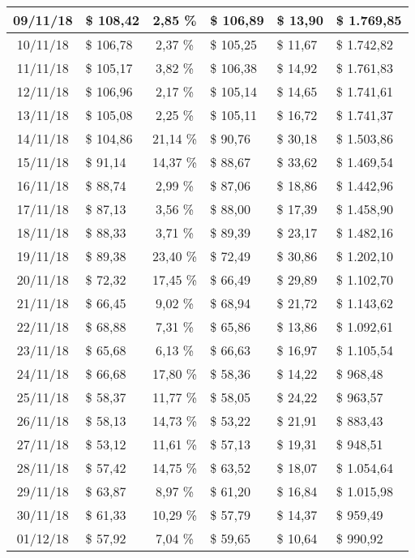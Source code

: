 \begin{center}
\begin{small}
\begin{longtable}{|c|l|c|l|l|l|}
09/11/18 & \$ 108,42 & 2,85 \% & \$ 106,89 & \$ 13,90 & \$ 1.769,85 \\ \hline
10/11/18 & \$ 106,78 & 2,37 \% & \$ 105,25 & \$ 11,67 & \$ 1.742,82 \\ \hline
11/11/18 & \$ 105,17 & 3,82 \% & \$ 106,38 & \$ 14,92 & \$ 1.761,83 \\ \hline
12/11/18 & \$ 106,96 & 2,17 \% & \$ 105,14 & \$ 14,65 & \$ 1.741,61 \\ \hline
13/11/18 & \$ 105,08 & 2,25 \% & \$ 105,11 & \$ 16,72 & \$ 1.741,37 \\ \hline
14/11/18 & \$ 104,86 & 21,14 \% & \$ 90,76 & \$ 30,18 & \$ 1.503,86 \\ \hline
15/11/18 & \$ 91,14 & 14,37 \% & \$ 88,67 & \$ 33,62 & \$ 1.469,54 \\ \hline
16/11/18 & \$ 88,74 & 2,99 \% & \$ 87,06 & \$ 18,86 & \$ 1.442,96 \\ \hline
17/11/18 & \$ 87,13 & 3,56 \% & \$ 88,00 & \$ 17,39 & \$ 1.458,90 \\ \hline
18/11/18 & \$ 88,33 & 3,71 \% & \$ 89,39 & \$ 23,17 & \$ 1.482,16 \\ \hline
19/11/18 & \$ 89,38 & 23,40 \% & \$ 72,49 & \$ 30,86 & \$ 1.202,10 \\ \hline
20/11/18 & \$ 72,32 & 17,45 \% & \$ 66,49 & \$ 29,89 & \$ 1.102,70 \\ \hline
21/11/18 & \$ 66,45 & 9,02 \% & \$ 68,94 & \$ 21,72 & \$ 1.143,62 \\ \hline
22/11/18 & \$ 68,88 & 7,31 \% & \$ 65,86 & \$ 13,86 & \$ 1.092,61 \\ \hline
23/11/18 & \$ 65,68 & 6,13 \% & \$ 66,63 & \$ 16,97 & \$ 1.105,54 \\ \hline
24/11/18 & \$ 66,68 & 17,80 \% & \$ 58,36 & \$ 14,22 & \$ 968,48 \\ \hline
25/11/18 & \$ 58,37 & 11,77 \% & \$ 58,05 & \$ 24,22 & \$ 963,57 \\ \hline
26/11/18 & \$ 58,13 & 14,73 \% & \$ 53,22 & \$ 21,91 & \$ 883,43 \\ \hline
27/11/18 & \$ 53,12 & 11,61 \% & \$ 57,13 & \$ 19,31 & \$ 948,51 \\ \hline
28/11/18 & \$ 57,42 & 14,75 \% & \$ 63,52 & \$ 18,07 & \$ 1.054,64 \\ \hline
29/11/18 & \$ 63,87 & 8,97 \% & \$ 61,20 & \$ 16,84 & \$ 1.015,98 \\ \hline
30/11/18 & \$ 61,33 & 10,29 \% & \$ 57,79 & \$ 14,37 & \$ 959,49 \\ \hline
01/12/18 & \$ 57,92 & 7,04 \% & \$ 59,65 & \$ 10,64 & \$ 990,92 \\ \hline

\end{longtable}
\end{small}
\end{center}
